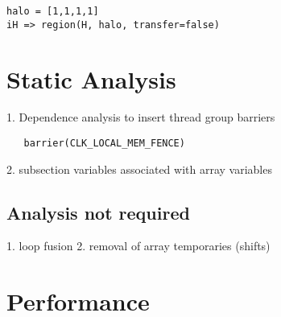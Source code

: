 \documentclass[10pt, conference, compsocconf]{IEEEtran}
\begin{document}
\begin{verbatim}
halo = [1,1,1,1]
iH => region(H, halo, transfer=false)
\end{verbatim}

\section{Static Analysis}

1. Dependence analysis to insert thread group barriers

\begin{verbatim}
   barrier(CLK_LOCAL_MEM_FENCE)
\end{verbatim}

2. subsection variables associated with array variables

\subsection{Analysis not required}

1. loop fusion
2. removal of array temporaries (shifts)

\section{Performance}
\end{document}
